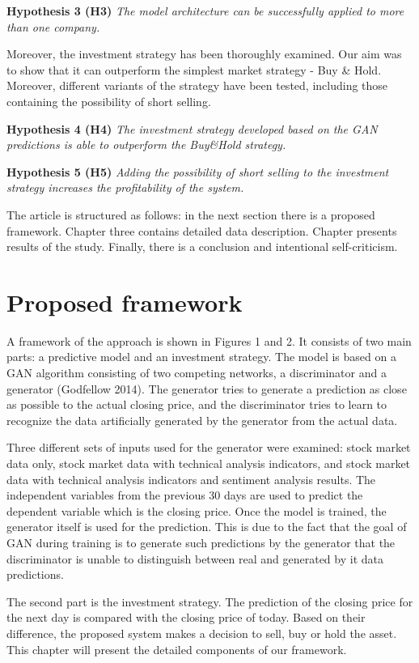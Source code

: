 \documentclass[review]{elsarticle} %
\begin{document}
\textbf{Hypothesis 3 (H3)} \textit{The model architecture can be successfully applied to more than one company.}

Moreover, the investment strategy has been thoroughly examined. Our aim was to show that it can outperform the simplest market strategy - Buy \& Hold. Moreover, different variants of the strategy have been tested, including those containing the possibility of short selling. 

\textbf{Hypothesis 4 (H4)} \textit{The investment strategy developed based on the GAN predictions is able to outperform the Buy\&Hold strategy.} 

\textbf{Hypothesis 5 (H5)} \textit{Adding the possibility of short selling to the investment strategy increases the profitability of the system.}

The article is structured as follows: in the next section there is a proposed framework. Chapter three contains detailed data description. Chapter presents results of the study. Finally, there is a conclusion and intentional self-criticism.

\section{Proposed framework}
A framework of the approach is shown in Figures 1 and 2. It consists of two main parts: a predictive model and an investment strategy. The model is based on a GAN algorithm consisting of two competing networks, a discriminator and a generator (Godfellow 2014). The generator tries to generate a prediction as close as possible to the actual closing price, and the discriminator tries to learn to recognize the data artificially generated by the generator from the actual data. 

Three different sets of inputs used for the generator were examined: stock market data only, stock market data with technical analysis indicators, and stock market data with technical analysis indicators and sentiment analysis results. The independent variables from the previous 30 days are used to predict the dependent variable which is the closing price. Once the model is trained, the generator itself is used for the prediction. This is due to the fact that the goal of GAN during training is to generate such predictions by the generator that the discriminator is unable to distinguish between real and generated by it data predictions.

The second part is the investment strategy. The prediction of the closing price for the next day is compared with the closing price of today. Based on their difference, the proposed system makes a decision to sell, buy or hold the asset. This chapter will present the detailed components of our framework. 
\end{document}
